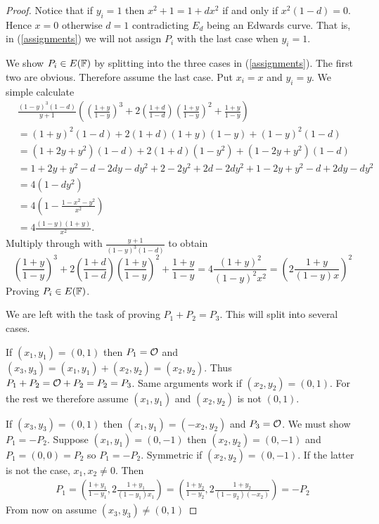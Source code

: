 \begin{proof}
Notice that if $y_i=1$ then $x^2+1=1+dx^2$ if and only if $x^2(1-d)=0$. Hence $x=0$ otherwise $d=1$ contradicting $E_d$ being an Edwards curve. That is, in (\ref{assignments}) we will not assign $P_i$ with the last case when $y_i=1$.

We show $P_i\in E(\mathbb{F})$ by splitting into the three cases in (\ref{assignments}). The first two are obvious. Therefore assume the last case. Put $x_i=x$ and $y_i=y$. We simple calculate
\begin{align*}
&\frac{(1-y)^3(1-d)}{y+1}\left(\left(\frac{1+y}{1-y}\right)^3+2\left(\frac{1+d}{1-d}\right)\left(\frac{1+y}{1-y}\right)^2+\frac{1+y}{1-y}\right) \\
&=(1+y)^2(1-d)+2(1+d)(1+y)(1-y)+(1-y)^2(1-d) \\
&=(1+2y+y^2)(1-d)+2(1+d)(1-y^2)+(1-2y+y^2)(1-d) \\
&=1+2y+y^2-d-2dy-dy^2+2-2y^2+2d-2dy^2+1-2y+y^2-d+2dy-dy^2 \\
&=4(1-dy^2)\\
&=4\left(1-\frac{1-x^2-y^2}{x^2}\right) \\
&=4\frac{(1-y)(1+y)}{x^2}.
\end{align*}
Multiply through with $\frac{y+1}{(1-y)^3(1-d)}$ to obtain
\[
\left(\frac{1+y}{1-y}\right)^3+2\left(\frac{1+d}{1-d}\right)\left(\frac{1+y}{1-y}\right)^2+\frac{1+y}{1-y} = 
4\frac{(1+y)^2}{(1-y)^2x^2}=\left(2\frac{1+y}{(1-y)x}\right)^2
\]
Proving $P_i\in E(\mathbb{F})$. 

We are left with the task of proving $P_1+P_2=P_3$. This will split into several cases. 

If $(x_1,y_1)=(0,1)$ then $P_1=\mathcal{O}$ and $(x_3,y_3)=(x_1,y_1)+(x_2,y_2)=(x_2,y_2)$. Thus $P_1+P_2=\mathcal{O}+P_2=P_2=P_3$. Same arguments work if $(x_2,y_2)=(0,1)$. For the rest we therefore assume $(x_1,y_1)$ and $(x_2,y_2)$ is not $(0,1)$. 

If $(x_3,y_3)=(0,1)$ then $(x_1,y_1)=(-x_2,y_2)$ and $P_3=\mathcal{O}$. We must show $P_1=-P_2$. Suppose $(x_1,y_1)=(0,-1)$ then $(x_2,y_2)=(0,-1)$ and $P_1=(0,0)=P_2$ so $P_1=-P_2$. Symmetric if $(x_2,y_2)=(0,-1)$. If the latter is not the case, $x_1,x_2\neq 0$. Then
\begin{align*}
	P_1=\left(\frac{1+y_1}{1-y_1},2\frac{1+y_1}{(1-y_1)x_1}\right)=\left(\frac{1+y_2}{1-y_2},2\frac{1+y_2}{(1-y_2)(-x_2)}\right)=-P_2
\end{align*}  
From now on assume $(x_3,y_3)\neq (0,1)$


\end{proof}
